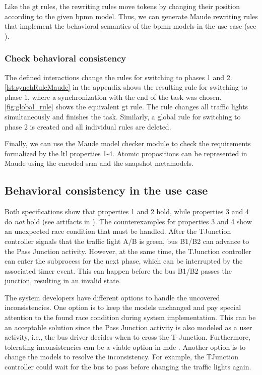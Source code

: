 \documentclass{jot}
\begin{document}
Like the \gls*{gt} rules, the rewriting rules move tokens by changing their position according to the given \gls*{bpmn} model.
Thus, we can generate Maude rewriting rules that implement the behavioral semantics of the \gls*{bpmn} models in the use case (see \cite{krauterArtifactsBehavioralConsistency2022}).


\subsubsection{Check behavioral consistency}
The defined interactions change the rules for switching to phases 1 and 2. \autoref{lst:synchRuleMaude} in the appendix shows the resulting rule for switching to phase 1, where a synchronization with the end of the task was chosen.
\autoref{fig:global_rule} shows the equivalent \gls*{gt} rule.
The rule changes all traffic lights simultaneously and finishes the task.
Similarly, a global rule for switching to phase 2 is created and all individual rules are deleted.

Finally, we can use the Maude model checker module to check the requirements formalized by the \gls*{ltl} properties 1-4.
Atomic propositions can be represented in Maude using the encoded \gls*{srm} and the snapshot metamodels.


\subsection{Behavioral consistency in the use case}
Both specifications show that properties 1 and 2 hold, while properties 3 and 4 do \emph{not} hold (see artifacts in \cite{krauterArtifactsBehavioralConsistency2022}).
The counterexamples for properties 3 and 4 show an unexpected race condition that must be handled.
After the TJunction controller signals that the traffic light A/B is green, bus B1/B2 can advance to the \textsf{Pass Junction} activity.
However, at the same time, the TJunction controller can enter the subprocess for the next phase, which can be interrupted by the associated timer event.
This can happen before the bus B1/B2 passes the junction, resulting in an invalid state.

The system developers have different options to handle the uncovered inconsistencies.
One option is to keep the models unchanged and pay special attention to the found race condition during system implementation.
This can be an acceptable solution since the \textsf{Pass Junction} activity is also modeled as a user activity, i.e., the bus driver decides when to cross the T-Junction.
Furthermore, tolerating inconsistencies can be a viable option in \gls*{mde} \cite{weidmannToleranceModelDrivenEngineering2021}.
Another option is to change the models to resolve the inconsistency.
For example, the TJunction controller could wait for the bus to pass before changing the traffic lights again.
\end{document}

